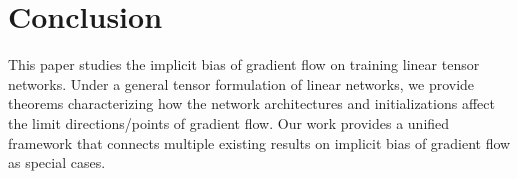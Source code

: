 \documentclass{article} %
\begin{document}
\section{Conclusion}
This paper studies the implicit bias of gradient flow on training linear tensor networks. Under a general tensor formulation of linear networks, we provide theorems characterizing how the network architectures and initializations affect the limit directions/points of gradient flow.
Our work provides a unified framework that connects multiple existing results on implicit bias of gradient flow as special cases.




\newpage
\appendix
\end{document}
